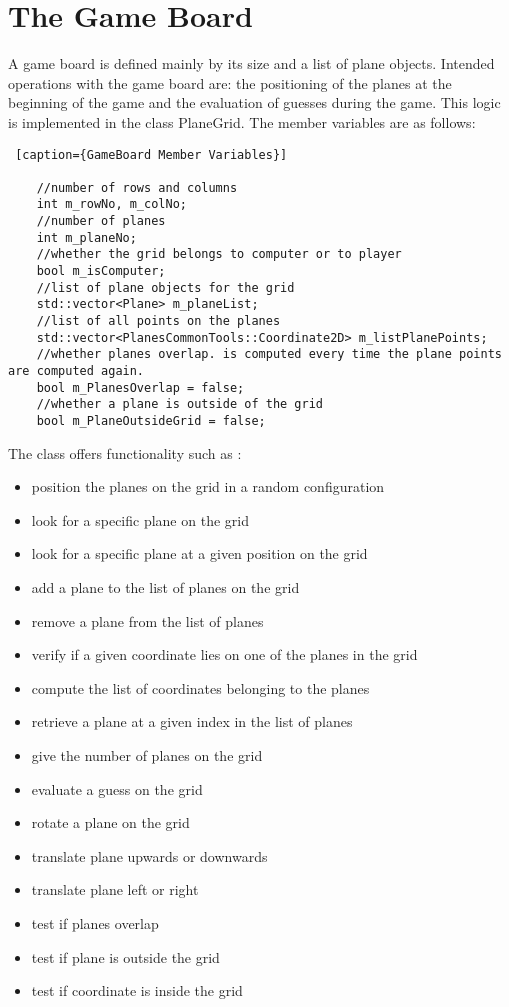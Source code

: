 \section{The Game Board}

A game board is defined mainly by its size and a list of plane objects. Intended operations with the game board are: the positioning of the planes at the beginning of the game and the evaluation of guesses during the game. This logic is implemented in the class PlaneGrid. The member variables are as follows:

\begin{lstlisting} [caption={GameBoard Member Variables}]

	//number of rows and columns
	int m_rowNo, m_colNo;
	//number of planes
	int m_planeNo;
	//whether the grid belongs to computer or to player
	bool m_isComputer;
	//list of plane objects for the grid
	std::vector<Plane> m_planeList;
	//list of all points on the planes
	std::vector<PlanesCommonTools::Coordinate2D> m_listPlanePoints;
	//whether planes overlap. is computed every time the plane points are computed again.
	bool m_PlanesOverlap = false;
	//whether a plane is outside of the grid
	bool m_PlaneOutsideGrid = false;

\end{lstlisting}

The class offers functionality such as :
\begin{itemize}
	\item position the planes on the grid in a random configuration
	\item look for a specific plane on the grid
	\item look for a specific plane at a given position on the grid
	\item add a plane to the list of planes on the grid
	\item remove a plane from the list of planes
	\item verify if a given coordinate lies on one of the planes in the grid
	\item compute the list of coordinates belonging to the planes
	\item retrieve a plane at a given index in the list of planes
	\item give the number of planes on the grid
	\item evaluate a guess on the grid
	\item rotate a plane on the grid
	\item translate plane upwards or downwards
	\item translate plane left or right
	\item test if planes overlap
	\item test if plane is outside the grid
	\item test if coordinate is inside the grid

\end{itemize}